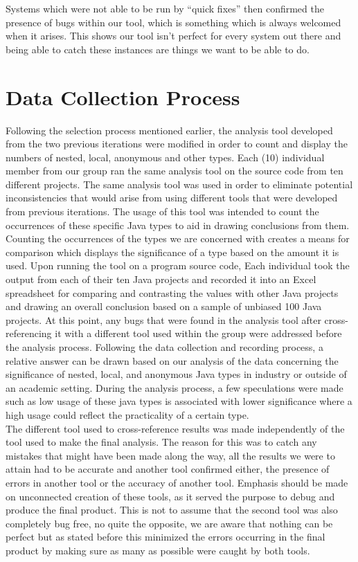 \documentclass{assignment}
\begin{document}
Systems which were not able to be run by “quick fixes” then confirmed the presence of bugs within our tool, which is something which is always welcomed when it arises. This shows our tool isn’t perfect for every system out there and being able to catch these instances are things we want to be able to do.\\ 

\section*{Data Collection Process}

Following the selection process mentioned earlier, the analysis tool developed from the two previous iterations were modified in order to count and display the numbers of nested, local, anonymous and other types. Each (10)  individual member from our group ran the same analysis tool on the source code from ten different projects. The same analysis tool was used in order to eliminate potential inconsistencies that would arise from using different tools that were developed from previous iterations. The usage of this tool was intended to count the occurrences of these specific Java types to aid in drawing conclusions from them. Counting the occurrences of the types we are concerned with creates a means for comparison which displays the significance of a type based on the amount it is used. Upon running the tool on a program source code, Each individual took the output from each of their ten Java projects and recorded it into an Excel spreadsheet for comparing and contrasting the values with other Java projects and drawing an overall conclusion based on a sample of unbiased 100 Java projects. At this point, any bugs that were found in the analysis tool after cross-referencing it with a different tool used within the group were addressed before the analysis process. Following the data collection and recording process, a relative answer can be drawn based on our analysis of the data concerning the significance of nested, local, and anonymous Java types in industry or outside of an academic setting. During the analysis process, a few speculations were made such as low usage of these java types is associated with lower significance where a high usage could reflect the practicality of a certain type.\\

The different tool used to cross-reference results was made independently of the tool used to make the final analysis. The reason for this was to catch any mistakes that might have been made along the way, all the results we were to attain had to be accurate and another tool confirmed either, the presence of errors in another tool or the accuracy of another tool. Emphasis should be made on unconnected creation of these tools, as it served the purpose to debug and produce the final product. This is not to assume that the second tool was also completely bug free, no quite the opposite, we are aware that nothing can be perfect but as stated before this minimized the errors occurring in the final product by making sure as many as possible were caught by both tools.\\
\end{document}
